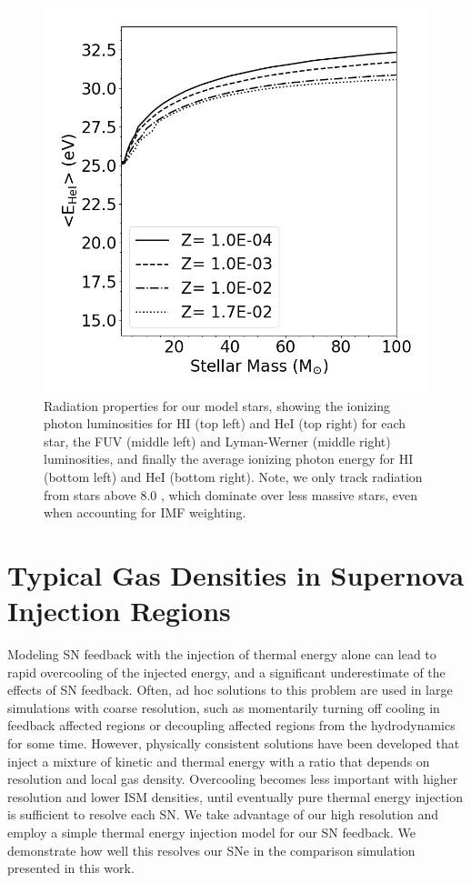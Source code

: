 \begin{figure}
\includegraphics[width=0.4\linewidth]{figures/ch1/E1}
\caption{Radiation properties for our model stars, showing the ionizing photon luminosities for HI (top left) and HeI (top right) for each star, the FUV (middle left) and Lyman-Werner (middle right) luminosities, and finally the average ionizing photon energy for HI (bottom left) and HeI (bottom right). Note, we only track radiation from stars above 8.0 \msun, which dominate over less massive stars, even when accounting for IMF weighting.}
\label{ch1:fig:stellar radiation properties}
\end{figure}

\section{Typical Gas Densities in Supernova Injection Regions}
\label{appendix:SN}

Modeling SN feedback with the injection of thermal energy alone can lead to rapid overcooling of the injected energy, and a significant underestimate of the effects of SN feedback. Often, ad hoc solutions to this problem are used in large simulations with coarse resolution, such as momentarily turning off cooling in feedback affected regions or decoupling affected regions from the hydrodynamics for some time. However, physically consistent solutions have been developed \citep[e.g][]{Simpson2016} that inject a mixture of kinetic and thermal energy with a ratio that depends on resolution and local gas density. Overcooling becomes less important with higher resolution and lower ISM densities, until eventually pure thermal energy injection is sufficient to resolve each SN. We take advantage of our high resolution and employ a simple thermal energy injection model for our SN feedback. We demonstrate how well this resolves our SNe in the comparison simulation presented in this work.

